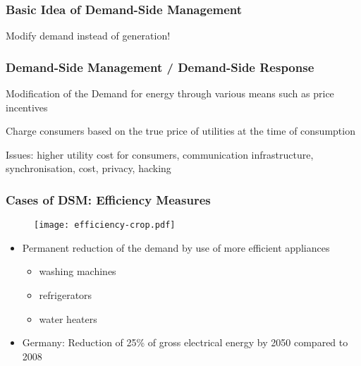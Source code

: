 \documentclass[10pt,aspectratio=169,dvipsnames]{beamer}
\let\olditem\item
\renewcommand{\item}{%
\olditem\vspace{5pt}}
\begin{document}
\begin{frame}
  \frametitle{Basic Idea of Demand-Side Management}

 Modify demand instead of generation!
  \vspace{0.5cm}

  \centering

\end{frame}

\begin{frame}
  \frametitle{Demand-Side Management / Demand-Side Response}

  Modification of the Demand for energy through various means such as price incentives

  Charge consumers based on the true price of utilities at the time of consumption

  Issues: higher utility cost for consumers, communication infrastructure, synchronisation, cost, privacy, hacking

\end{frame}

\begin{frame}
 \frametitle{Cases of DSM: Efficiency Measures}
 \begin{minipage}[t]{0.5\textwidth}
    \begin{figure}
  \texttt{[image: efficiency-crop.pdf]}
  \end{figure}
\end{minipage}\hfill
\begin{minipage}[t]{0.5\textwidth}
\begin{itemize}
 \item Permanent reduction of the demand by use of more efficient appliances
 \begin{itemize}
 \item washing machines
 \item refrigerators
 \item water heaters
 \end{itemize}
 \item Germany: Reduction of 25\% of gross electrical energy by 2050 compared to 2008
\end{itemize}

\end{minipage}


\end{frame}
\end{document}
